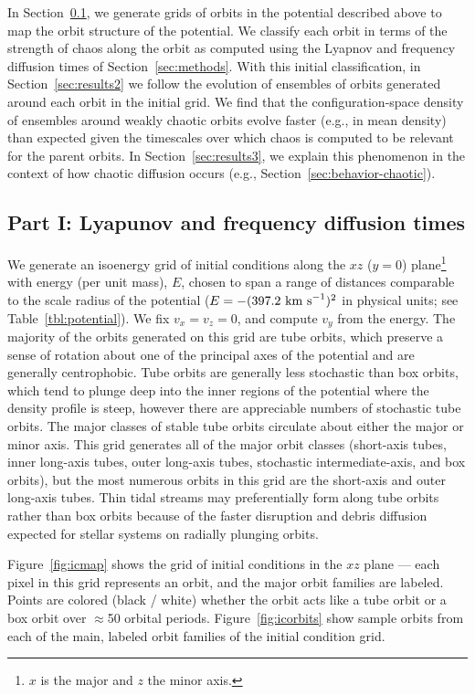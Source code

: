\documentclass[letterpaper,12pt,preprint]{aastex}
\begin{document}
In Section~\ref{sec:results1}, we generate grids of orbits in the potential described above to map the orbit structure of the potential. We classify each orbit in terms of the strength of chaos along the orbit as computed using the Lyapnov and frequency diffusion times of Section~\ref{sec:methods}. With this initial classification, in Section~\ref{sec:results2} we follow the evolution of ensembles of orbits generated around each orbit in the initial grid. We find that the configuration-space density of ensembles around weakly chaotic orbits evolve faster (e.g., in mean density) than expected given the timescales over which chaos is computed to be relevant for the parent orbits. In Section~\ref{sec:results3}, we explain this phenomenon in the context of how chaotic diffusion occurs (e.g., Section~\ref{sec:behavior-chaotic}).

\subsection{Part I: Lyapunov and frequency diffusion times}\label{sec:results1}

We generate an isoenergy grid of initial conditions along the $xz$ ($y=0$) plane\footnote{$x$ is the major and $z$ the minor axis.} with energy (per unit mass), $E$, chosen to span a range of distances comparable to the scale radius of the potential ($E=-(397.2~{\rm km~s}^{-1})^2$ in physical units; see Table~\ref{tbl:potential}). We fix $v_x = v_z = 0$, and compute $v_y$ from the energy. The majority of the orbits generated on this grid are tube orbits, which preserve a sense of rotation about one of the principal axes of the potential and are generally centrophobic. Tube orbits are generally less stochastic than box orbits, which tend to plunge deep into the inner regions of the potential where the density profile is steep, however there are appreciable numbers of stochastic tube orbits. The major classes of stable tube orbits circulate about either the major or minor axis. This grid generates all of the major orbit classes (short-axis tubes, inner long-axis tubes, outer long-axis tubes, stochastic intermediate-axis, and box orbits), but the most numerous orbits in this grid are the short-axis and outer long-axis tubes. Thin tidal streams may preferentially form along tube orbits rather than box orbits because of the faster disruption and debris diffusion expected for stellar systems on radially plunging orbits.

Figure~\ref{fig:icmap} shows the grid of initial conditions in the $xz$ plane --- each pixel in this grid represents an orbit, and the major orbit families are labeled. Points are colored (black / white) whether the orbit acts like a tube orbit or a box orbit over $\approx$50 orbital periods. Figure~\ref{fig:icorbits} show sample orbits from each of the main, labeled orbit families of the initial condition grid.
\end{document}
